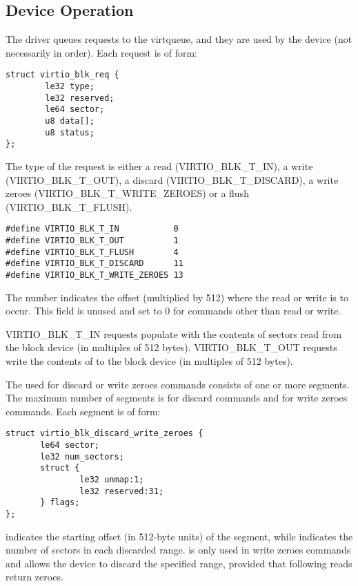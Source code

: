 \subsection{Device Operation}\label{sec:Device Types / Block Device / Device Operation}

The driver queues requests to the virtqueue, and they are used by
the device (not necessarily in order). Each request is of form:

\begin{lstlisting}
struct virtio_blk_req {
        le32 type;
        le32 reserved;
        le64 sector;
        u8 data[];
        u8 status;
};
\end{lstlisting}

The type of the request is either a read (VIRTIO_BLK_T_IN), a write
(VIRTIO_BLK_T_OUT), a discard (VIRTIO_BLK_T_DISCARD), a write zeroes
(VIRTIO_BLK_T_WRITE_ZEROES) or a flush (VIRTIO_BLK_T_FLUSH).

\begin{lstlisting}
#define VIRTIO_BLK_T_IN           0
#define VIRTIO_BLK_T_OUT          1
#define VIRTIO_BLK_T_FLUSH        4
#define VIRTIO_BLK_T_DISCARD      11
#define VIRTIO_BLK_T_WRITE_ZEROES 13
\end{lstlisting}

The  number indicates the offset (multiplied by 512) where
the read or write is to occur. This field is unused and set to 0 for
commands other than read or write.

VIRTIO_BLK_T_IN requests populate  with the contents of sectors
read from the block device (in multiples of 512 bytes).  VIRTIO_BLK_T_OUT
requests write the contents of  to the block device (in multiples
of 512 bytes).

The  used for discard or write zeroes commands consists of one or
more segments.  The maximum number of segments is  for
discard commands and  for write zeroes commands.
Each segment is of form:

\begin{lstlisting}
struct virtio_blk_discard_write_zeroes {
       le64 sector;
       le32 num_sectors;
       struct {
               le32 unmap:1;
               le32 reserved:31;
       } flags;
};
\end{lstlisting}

 indicates the starting offset (in 512-byte units) of the
segment, while  indicates the number of sectors in each
discarded range.  is only used in write zeroes commands and allows
the device to discard the specified range, provided that following reads return
zeroes.

